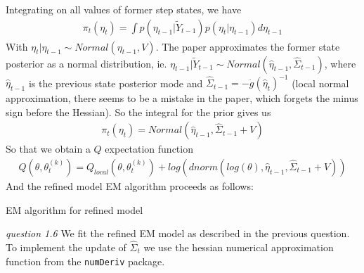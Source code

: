 \documentclass[twoside]{article}
\begin{document}
Integrating on all values of former step states, we have
\begin{align*}
\pi_t(\eta_t) = \int p(\eta_{t - 1} | \tilde{Y}_{t - 1}) p(\eta_t | \eta_{t - 1}) d\eta_{t -1 }
\end{align*}
With $\eta_t | \eta_{t - 1} \sim Normal(\eta_{t - 1}, V)$. The paper approximates the former state posterior as a normal distribution, ie. $\eta_{t - 1} | \tilde{Y}_{t - 1} \sim Normal(\hat{\eta}_{t - 1}, \hat{\Sigma}_{t -1 })$, where $\hat{\eta}_{t - 1}$ is the previous state posterior mode and $\hat{\Sigma}_{t -1 } = - \ddot{g}(\hat{\eta}_t)^{-1}$ (local normal approximation, there seems to be a mistake in the paper, which forgets the minus sign before the Hessian). So the integral for the prior gives us
\begin{align*}
\pi_t(\eta_t) = Normal(\hat{\eta}_{t - 1}, \hat{\Sigma}_{t - 1} + V)
\end{align*}
So that we obtain a $Q$ expectation function
\begin{eqnarray}
Q(\theta, \theta_t^{(k)}) = Q_{local}(\theta, \theta_t^{(k)}) + log\left(dnorm\left(log(\theta), \hat{\eta}_{t - 1}, \hat{\Sigma}_{t - 1} + V\right)\right) 
\end{eqnarray}
And the refined model EM algorithm proceeds as follows:\\

\vspace{.2 in}
\begin{algorithm}[H]
 \caption{EM algorithm for refined model}
\end{algorithm}
\vspace{.2 in}
\textit{question 1.6} We fit the refined EM model as described in the previous question. To implement the update of $\hat{\Sigma}_t$ we use the hessian numerical approximation function from the \texttt{numDeriv} package.\\
\end{document}
